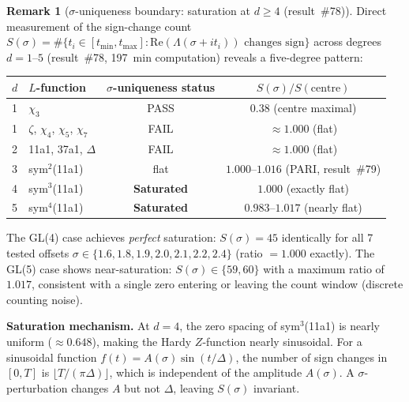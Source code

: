 \documentclass[11pt, a4paper]{article}
\theoremstyle{definition}
\newtheorem{remark}{Remark}[section]
\theoremstyle{plain}
\begin{document}
\begin{remark}[$\sigma$-uniqueness boundary: saturation at $d \geq 4$ (result~\#78)]
\label{rem:sigma_saturation_d4}
Direct measurement of the sign-change count $S(\sigma) = \#\{t_i \in [t_{\min}, t_{\max}] : \mathrm{Re}(\Lambda(\sigma+it_i))\text{ changes sign}\}$ across degrees $d = 1$--$5$ (result~\#78, 197~min computation) reveals a five-degree pattern:
\begin{center}
\small
\begin{tabular}{llcc}
\toprule
$d$ & $L$-function & $\sigma$-uniqueness status & $S(\sigma)/S(\text{centre})$ \\
\midrule
1 & $\chi_3$ & PASS & $0.38$ (centre maximal) \\
1 & $\zeta$, $\chi_4$, $\chi_5$, $\chi_7$ & FAIL & $\approx 1.000$ (flat) \\
2 & 11a1, 37a1, $\Delta$ & FAIL & $\approx 1.000$ (flat) \\
3 & sym$^2$(11a1) & flat & $1.000$--$1.016$ (PARI, result~\#79) \\
4 & sym$^3$(11a1) & \textbf{Saturated} & $1.000$ (exactly flat) \\
5 & sym$^4$(11a1) & \textbf{Saturated} & $0.983$--$1.017$ (nearly flat) \\
\bottomrule
\end{tabular}
\end{center}
The GL(4) case achieves \emph{perfect} saturation: $S(\sigma) = 45$ identically for all 7 tested offsets $\sigma \in \{1.6, 1.8, 1.9, 2.0, 2.1, 2.2, 2.4\}$ (ratio $= 1.000$ exactly).  The GL(5) case shows near-saturation: $S(\sigma) \in \{59, 60\}$ with a maximum ratio of $1.017$, consistent with a single zero entering or leaving the count window (discrete counting noise).

\medskip\noindent
\textbf{Saturation mechanism.}  At $d = 4$, the zero spacing of sym$^3$(11a1) is nearly uniform ($\approx 0.648$), making the Hardy $Z$-function nearly sinusoidal.  For a sinusoidal function $f(t) = A(\sigma)\sin(t/\Delta)$, the number of sign changes in $[0,T]$ is $\lfloor T/(\pi\Delta) \rfloor$, which is independent of the amplitude $A(\sigma)$.  A $\sigma$-perturbation changes $A$ but not $\Delta$, leaving $S(\sigma)$ invariant.


\end{remark}
\end{document}
